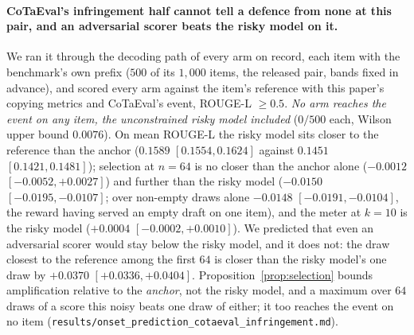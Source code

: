 \paragraph{CoTaEval's infringement half cannot tell a defence from none at this pair, and an adversarial
scorer beats the risky model on it.} We ran it through the decoding path of every arm on record, each
item with the benchmark's own prefix ($500$ of its $1{,}000$ items, the released pair, bands fixed in
advance), and scored every arm against the item's reference with this paper's copying metrics and
CoTaEval's event, ROUGE-L \citep{lin2004rouge} $\ge 0.5$. \emph{No arm reaches the event on any item, the unconstrained
risky model included} ($0/500$ each, Wilson upper bound $0.0076$). On mean ROUGE-L the risky model
sits closer to the reference than the anchor ($0.1589$ $[0.1554, 0.1624]$ against $0.1451$ $[0.1421,
0.1481]$); selection at $n=64$ is no closer than the anchor alone ($-0.0012$ $[-0.0052, +0.0027]$)
and further than the risky model ($-0.0150$ $[-0.0195, -0.0107]$; over non-empty draws alone
$-0.0148$ $[-0.0191, -0.0104]$, the reward having served an empty draft on one item), and the meter
at $k=10$ is the risky model ($+0.0004$ $[-0.0002, +0.0010]$). We predicted that even an adversarial
scorer would stay below the risky model, and it does not: the draw closest to the reference among
the first $64$ is closer than the risky model's one draw by $+0.0370$ $[+0.0336, +0.0404]$.
Proposition~\ref{prop:selection} bounds amplification relative to the \emph{anchor}, not the risky
model, and a maximum over $64$ draws of a score this noisy beats one draw of either; it too reaches the
event on no item
(\texttt{results/\allowbreak onset\_\allowbreak prediction\_\allowbreak cotaeval\_\allowbreak infringement.md}).

